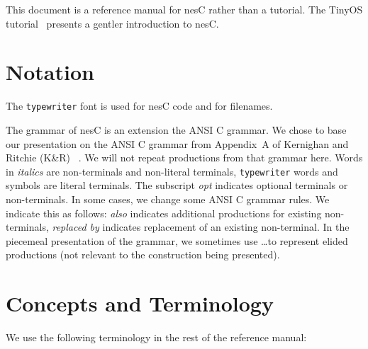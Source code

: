 \documentclass[11pt]{article}
\newcommand{\kw}[1]{{\tt #1}}
\newcommand{\nesc}{nesC\xspace}
\begin{document}
This document is a reference manual for \nesc rather than a tutorial. The
TinyOS tutorial~\cite{tinyos-tutorial} presents a gentler introduction
to \nesc.

\section{Notation}

The \texttt{typewriter} font is used for \nesc code and for filenames.

The grammar of \nesc is an extension the ANSI C grammar. We chose to base
our presentation on the ANSI C grammar from Appendix~A of Kernighan and
Ritchie (K\&R) ~\cite[pp234--239]{kandr}. We will not repeat productions
from that grammar here. Words in \emph{italics} are non-terminals and
non-literal terminals, \kw{typewriter} words and symbols are literal
terminals. The subscript \emph{opt} indicates optional terminals or
non-terminals. In some cases, we change some ANSI C grammar rules. We
indicate this as follows: \emph{also} indicates additional productions for
existing non-terminals, \emph{replaced by} indicates replacement of an
existing non-terminal. In the piecemeal presentation of the grammar, we
sometimes use \ldots to represent elided productions (not relevant to the
construction being presented).

\section{Concepts and Terminology}

We use the following terminology in the rest of the reference manual:
\end{document}
